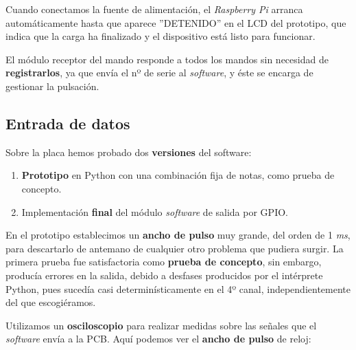 \smallskip

Cuando conectamos la fuente de alimentación, el \textit{Raspberry Pi} arranca automáticamente hasta que aparece ''DETENIDO'' en el \acrshort{LCD} del prototipo, que indica que la carga ha finalizado y el dispositivo está listo para funcionar.

El módulo receptor del mando responde a todos los mandos sin necesidad de \textbf{registrarlos}, ya que envía el nº de serie al \textit{software}, y éste se encarga de gestionar la pulsación.

\subsection{Entrada de datos}

Sobre la placa hemos probado dos \textbf{versiones} del software:

\begin{enumerate}
	\item \textbf{Prototipo} en Python con una combinación fija de notas, como prueba de concepto.
	\item Implementación \textbf{final} del módulo \textit{software} de salida por \acrshort{GPIO}.
\end{enumerate}

En el prototipo establecimos un \textbf{ancho de pulso} muy grande, del orden de 1 \textit{ms}, para descartarlo de antemano de cualquier otro problema que pudiera surgir. La primera prueba fue satisfactoria como \textbf{prueba de concepto}, sin embargo, producía errores en la salida, debido a desfases producidos por el intérprete Python, pues sucedía casi determinísticamente en el 4º canal, independientemente del que escogiéramos.

Utilizamos un \textbf{osciloscopio} para realizar medidas sobre las señales que el \textit{software} envía a la \acrshort{PCB}. Aquí podemos ver el \textbf{ancho de pulso} de reloj:

\smallskip

